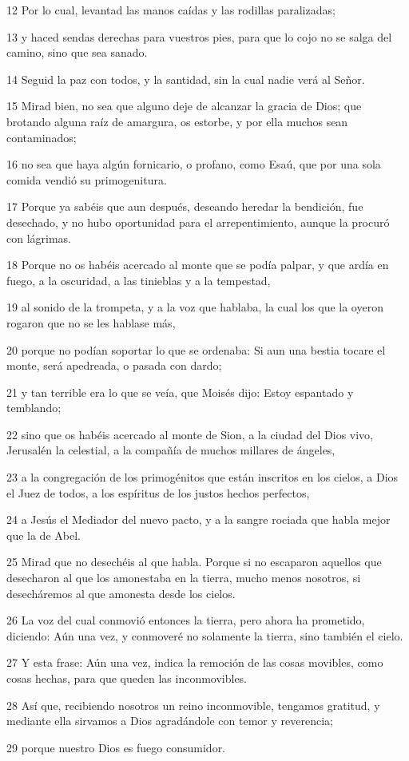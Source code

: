 \par 12 Por lo cual, levantad las manos caídas y las rodillas paralizadas;
\par 13 y haced sendas derechas para vuestros pies, para que lo cojo no se salga del camino, sino que sea sanado.
\par 14 Seguid la paz con todos, y la santidad, sin la cual nadie verá al Señor.
\par 15 Mirad bien, no sea que alguno deje de alcanzar la gracia de Dios; que brotando alguna raíz de amargura, os estorbe, y por ella muchos sean contaminados;
\par 16 no sea que haya algún fornicario, o profano, como Esaú, que por una sola comida vendió su primogenitura.
\par 17 Porque ya sabéis que aun después, deseando heredar la bendición, fue desechado, y no hubo oportunidad para el arrepentimiento, aunque la procuró con lágrimas.
\par 18 Porque no os habéis acercado al monte que se podía palpar, y que ardía en fuego, a la oscuridad, a las tinieblas y a la tempestad,
\par 19 al sonido de la trompeta, y a la voz que hablaba, la cual los que la oyeron rogaron que no se les hablase más,
\par 20 porque no podían soportar lo que se ordenaba: Si aun una bestia tocare el monte, será apedreada, o pasada con dardo;
\par 21 y tan terrible era lo que se veía, que Moisés dijo: Estoy espantado y temblando;
\par 22 sino que os habéis acercado al monte de Sion, a la ciudad del Dios vivo, Jerusalén la celestial, a la compañía de muchos millares de ángeles,
\par 23 a la congregación de los primogénitos que están inscritos en los cielos, a Dios el Juez de todos, a los espíritus de los justos hechos perfectos,
\par 24 a Jesús el Mediador del nuevo pacto, y a la sangre rociada que habla mejor que la de Abel.
\par 25 Mirad que no desechéis al que habla. Porque si no escaparon aquellos que desecharon al que los amonestaba en la tierra, mucho menos nosotros, si desecháremos al que amonesta desde los cielos.
\par 26 La voz del cual conmovió entonces la tierra, pero ahora ha prometido, diciendo: Aún una vez, y conmoveré no solamente la tierra, sino también el cielo.
\par 27 Y esta frase: Aún una vez, indica la remoción de las cosas movibles, como cosas hechas, para que queden las inconmovibles.
\par 28 Así que, recibiendo nosotros un reino inconmovible, tengamos gratitud, y mediante ella sirvamos a Dios agradándole con temor y reverencia;
\par 29 porque nuestro Dios es fuego consumidor.

